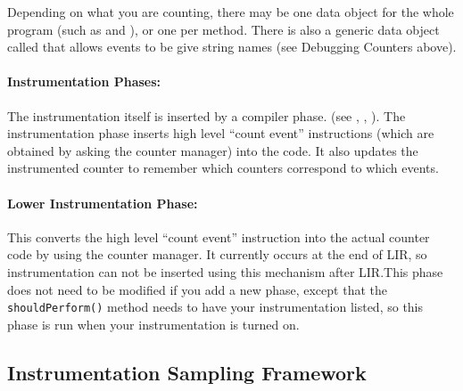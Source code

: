 
Depending on what you are counting, there may be one data object for
the whole program (such as 
 and
), 
or one per method.  There is also a
generic data object called 
that
allows events to be give string names (see Debugging Counters above).

\paragraph{Instrumentation Phases:}  The instrumentation itself is
inserted by a compiler phase.  (see
,
,
).  The instrumentation phase
inserts high level ``count event'' instructions (which are obtained by
asking the counter manager) into the code.  It also updates the
instrumented counter to remember which counters correspond to which
events.

\paragraph{Lower Instrumentation Phase:}  This 
converts the high level ``count event'' instruction into the actual
counter code by using the counter manager.  It currently occurs at the
end of LIR, so instrumentation can not be inserted using this
mechanism after LIR.\@  This phase does not need to be modified if you
add a new phase, except that the {\tt shouldPerform()} method needs to
have your instrumentation listed, so this phase is run when your
instrumentation is turned on.

\subsection{Instrumentation Sampling Framework}
\label{instrumentation_sampling}

